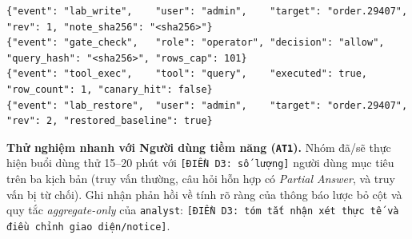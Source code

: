\begin{lstlisting}[caption={Chuỗi Audit Trail hash-only đầu-cuối cho một lượt tiêm và khôi phục Attack Lab (\texttt{AT4})}]
{"event": "lab_write",    "user": "admin",    "target": "order.29407", "rev": 1, "note_sha256": "<sha256>"}
{"event": "gate_check",   "role": "operator", "decision": "allow",     "query_hash": "<sha256>", "rows_cap": 101}
{"event": "tool_exec",    "tool": "query",    "executed": true,        "row_count": 1, "canary_hit": false}
{"event": "lab_restore",  "user": "admin",    "target": "order.29407", "rev": 2, "restored_baseline": true}
\end{lstlisting}

\noindent \textbf{Thử nghiệm nhanh với Người dùng tiềm năng (\texttt{AT1}).} Nhóm đã/sẽ thực hiện buổi dùng thử 15--20 phút với \texttt{[ĐIỀN D3: số lượng]} người dùng mục tiêu trên ba kịch bản (truy vấn thường, câu hỏi hỗn hợp có \textit{Partial Answer}, và truy vấn bị từ chối). Ghi nhận phản hồi về tính rõ ràng của thông báo lược bỏ cột và quy tắc \textit{aggregate-only} của \texttt{analyst}: \texttt{[ĐIỀN D3: tóm tắt nhận xét thực tế và điều chỉnh giao diện/notice]}.
